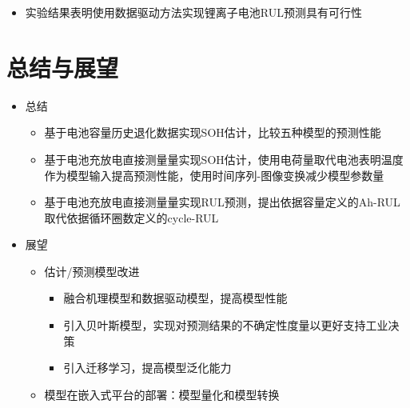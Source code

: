 \documentclass{beamer}
\begin{document}
\begin{frame}
\begin{table}[]
	\centering
	\captionsetup{font=tiny}
	\caption{DeepLSTM模型电池Ah-RUL预测性能}
	\end{table}
	\begin{itemize}
		\item 实验结果表明使用数据驱动方法实现锂离子电池RUL预测具有可行性
	\end{itemize}
\end{frame}

\section{总结与展望}

\begin{frame}
	\begin{itemize}
		\item 总结
			\begin{itemize}
				\item 基于电池容量历史退化数据实现SOH估计，比较五种模型的预测性能
				\item 基于电池充放电直接测量量实现SOH估计，使用电荷量取代电池表明温度作为模型输入提高预测性能，使用时间序列-图像变换减少模型参数量
				\item 基于电池充放电直接测量量实现RUL预测，提出依据容量定义的Ah-RUL取代依据循环圈数定义的cycle-RUL
			\end{itemize}
		\item 展望
			\begin{itemize}
				\item 估计/预测模型改进
					\begin{itemize}
						\item 融合机理模型和数据驱动模型，提高模型性能
						\item 引入贝叶斯模型，实现对预测结果的不确定性度量以更好支持工业决策
						\item 引入迁移学习，提高模型泛化能力
					\end{itemize}
				\item 模型在嵌入式平台的部署：模型量化和模型转换
			\end{itemize}
	\end{itemize}
\end{frame}
\end{document}
